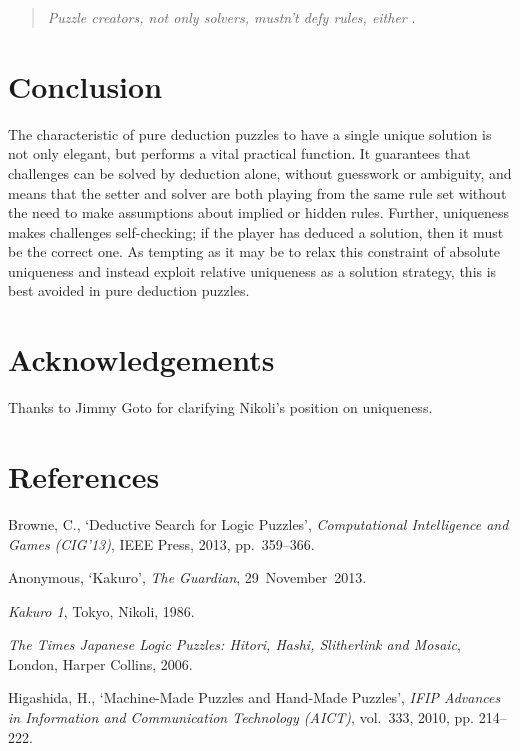 \documentclass[12pt]{gapd}
\begin{document}
\begin{quote}
  \textit{Puzzle creators, not only solvers, mustn't defy rules, either}
  \cite[p216]{Higashida2010}.
\end{quote}

\section{Conclusion}
\label{sec:Conclusion}

The characteristic of pure deduction puzzles to have a single unique
solution is not only elegant, but performs a vital practical function.
It guarantees that challenges can be solved by deduction alone,
without guesswork or ambiguity, and means that the setter and solver
are both playing from the same rule set without the need to make
assumptions about implied or hidden rules.  Further, uniqueness makes
challenges self-checking; if the player has deduced a solution, then
it must be the correct one.  As tempting as it may be to relax this
constraint of absolute uniqueness and instead exploit relative
uniqueness as a solution strategy, this is best avoided in pure
deduction puzzles.

\section*{Acknowledgements}

Thanks to Jimmy Goto for clarifying Nikoli's position on uniqueness.

\section*{References}

\begin{thebibliography}{4}

 Browne, C., `Deductive Search for Logic Puzzles',
  \textit{Computational Intelligence and Games (CIG'13)}, IEEE Press,
  2013, pp.~359--366.

 Anonymous, `Kakuro', \textit{The Guardian},
  29~November~2013.

 \textit{Kakuro 1}, Tokyo, Nikoli, 1986.

 \textit{The Times Japanese Logic Puzzles: Hitori, Hashi,
    Slitherlink and Mosaic}, London, Harper Collins, 2006.

 Higashida, H., `Machine-Made Puzzles and
  Hand-Made Puzzles', \textit{IFIP Advances in Information and
    Communication Technology (AICT)}, vol.~333, 2010, pp. 214--222.

\end{thebibliography}

\end{document}
